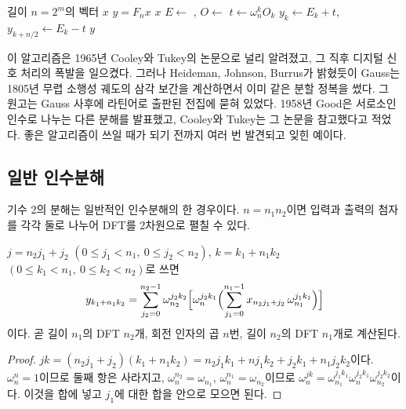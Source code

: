 \begin{algorithm}[t]
\begin{algorithmic}[1]
\Require 길이 $n=2^m$의 벡터 $x$
\Ensure $y=F_nx$
   \Return $x$
  \EndIf
  \State $E\gets$ , $O\gets$ 
    \State $t\gets\omega_n^kO_k$ 
    \State $y_k\gets E_k+t$, $y_{k+n/2}\gets E_k-t$ 
  \EndFor
  \State \Return $y$
\EndFunction
\end{algorithmic}
\caption{기수 2의 재귀 FFT}
\label{alg:fft-radix2}
\end{algorithm}

\begin{aside}
이 알고리즘은 1965년 Cooley와 Tukey의 논문으로 널리 알려졌고\cite{cooley1965}, 그 직후 디지털 신호 처리의 폭발을 일으켰다. 그러나 Heideman, Johnson, Burrus가 밝혔듯이 Gauss는 1805년 무렵 소행성 궤도의 삼각 보간을 계산하면서 이미 같은 분할 정복을 썼다\cite{heideman1984gauss}. 그 원고는 Gauss 사후에 라틴어로 출판된 전집에 묻혀 있었다. 1958년 Good은 서로소인 인수로 나누는 다른 분해를 발표했고\cite{good1958}, Cooley와 Tukey는 그 논문을 참고했다고 적었다. 좋은 알고리즘이 쓰일 때가 되기 전까지 여러 번 발견되고 잊힌 예이다.
\end{aside}

\subsection{일반 인수분해}

기수 2의 분해는 일반적인 인수분해의 한 경우이다. $n=n_1n_2$이면 입력과 출력의 첨자를 각각 둘로 나누어 DFT를 2차원으로 펼칠 수 있다.

\begin{proposition}
\label{prop:mixed-radix}
$j=n_2j_1+j_2$ $(0\le j_1<n_1,\ 0\le j_2<n_2)$, $k=k_1+n_1k_2$ $(0\le k_1<n_1,\ 0\le k_2<n_2)$로 쓰면
\[
y_{k_1+n_1k_2}=\sum_{j_2=0}^{n_2-1}\omega_{n_2}^{j_2k_2}\Bigl[\omega_n^{j_2k_1}\Bigl(\sum_{j_1=0}^{n_1-1}x_{n_2j_1+j_2}\,\omega_{n_1}^{j_1k_1}\Bigr)\Bigr]
\]
이다. 곧 길이 $n_1$의 DFT $n_2$개, 회전 인자의 곱 $n$번, 길이 $n_2$의 DFT $n_1$개로 계산된다.
\end{proposition}

\begin{proof}
$jk=(n_2j_1+j_2)(k_1+n_1k_2)=n_2j_1k_1+nj_1k_2+j_2k_1+n_1j_2k_2$이다. $\omega_n^{n}=1$이므로 둘째 항은 사라지고, $\omega_n^{n_2}=\omega_{n_1}$, $\omega_n^{n_1}=\omega_{n_2}$이므로 $\omega_n^{jk}=\omega_{n_1}^{j_1k_1}\omega_n^{j_2k_1}\omega_{n_2}^{j_2k_2}$이다. 이것을 합에 넣고 $j_1$에 대한 합을 안으로 모으면 된다.
\end{proof}


